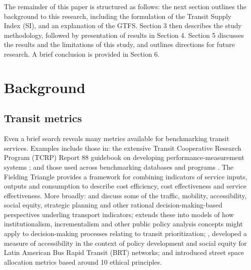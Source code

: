 \documentclass[preprint, 3p,
authoryear]{elsarticle} %
\begin{document}
The remainder of this paper is structured as follows: the next section
outlines the background to this research, including the formulation of
the Transit Supply Index (SI), and an explanation of the GTFS. Section 3
then describes the study methodology, followed by presentation of
results in Section 4. Section 5 discusses the results and the
limitations of this study, and outlines directions for future research.
A brief conclusion is provided in Section 6.

\hypertarget{background}{%
\section{Background}\label{background}}

\hypertarget{transit-metrics}{%
\subsection{Transit metrics}\label{transit-metrics}}

Even a brief search reveals many metrics available for benchmarking
transit services. Examples include those in: the extensive Transit
Cooperative Research Program (TCRP) Report 88 guidebook on developing
performance-measurement systems \citep{Ryus:2003aa}; and those used
across benchmarking databases and programs
\citep{Florida-Transit-Information-System:2018aa, UITP:2015aa, Imperial-College-London:2023aa}.
The Fielding Triangle \citep{FieldingGordonJ1987Mpts} provides a
framework for combining indicators of service inputs, outputs and
consumption to describe cost efficiency, cost effectiveness and service
effectiveness. More broadly: \citet{Litman:2003ab} and
\citet{Litman:2016aa} discuss some of the traffic, mobility,
accessibility, social equity, strategic planning and other rational
decision-making-based perspectives underling transport indicators;
\citet{Reynolds:2017ah} extends these into models of how
institutionalism, incrementalism and other public policy analysis
concepts might apply to decision-making processes relating to transit
prioritization; \citet{GuzmanLuisA.2017Aeit}, developed a measure of
accessibility in the context of policy development and social equity for
Latin American Bus Rapid Transit (BRT) networks; and
\citet{Creutzig2020streetspaceallocation} introduced street space
allocation metrics based around 10 ethical principles.
\end{document}
